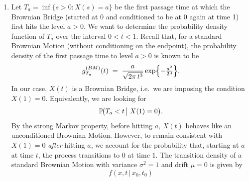 \documentclass[12pt]{article}
\begin{document}
\begin{enumerate}

		Now, think about the fact that $X(t)$ is a Browmian Motion: we know that it has strong Markov property. Therefore we can ``split'' the process in two: instead of considering only one process reaching $x$ at time $t$ and $0$ at time $1$ starting from $y$ at time $\tau$, we consider one process reaching level $x$ at time $t$ starting from $y$ at time $\tau$ and another reaching 0 at time 1 starting from $x$ at time $t$. This makes sense because the probability of going from $(x,t)$ to $(1,0)$ is not dependent on the probability of being in $(y,\tau)$ because of the strong Markov property. Using, as well, independence between increments of Brownian motion, we get
		\begin{equation*}
			\pr(X(t)<x|X(\tau)=y,X(1)=0)=\frac{\pr(X(t)<x|X(\tau)=y)\pr(X(1)=0|X(t)=x)}{\pr(X(1)=0|X(\tau)=y)}
		\end{equation*}
		These are all cumulative density functions, but we want to apply this result to the continuous setting we are working in.
		\begin{equation*}
			\ubracketthin{\frac{\partial}{\partial x}\pr(X(t)<x|X(\tau)=y,X(1)=0)}_{\varphi(x,t|y,\tau)}=\frac{f(x,t|y,\tau)f(0,1|x,t)}{f(0,1|y,\tau)}.
		\end{equation*}
		\item
		Let $T_a = \inf\{ s>0 : X(s) = a\}$ be the {first passage time} at which the Brownian Bridge (started at 0 and conditioned to be at 0 again at time 1) first hits the level $a > 0$. We want to determine the probability density function of $T_a$ over the interval $0 < t < 1$.
		Recall that, for a {standard Brownian Motion} (without conditioning on the endpoint), the probability density of the first passage time to level $a>0$ is known to be
		\[
		g_{T_a}^{(BM)}(t)
		\;=\;
		\frac{a}{\sqrt{2\pi\,t^{3}}}
		\exp\Bigl\{-\tfrac{a^{2}}{2\,t}\Bigr\}.
		\]
		In our case, $X(t)$ is a Brownian Bridge, i.e.\ we are imposing the condition $X(1)=0$. Equivalently, we are looking for
		\[
		\mathbb{P}\!\bigl(T_a < t \,\big|\; X(1)=0\bigr).
		\]
		By the strong Markov property, before hitting $a$, $X(t)$ behaves like an unconditioned Brownian Motion. However, to remain consistent with $X(1)=0$ \textit{after} hitting $a$, we account for the probability that, starting at $a$ at time $t$, the process transitions to $0$ at time $1$. 
		The transition density of a standard Brownian Motion with variance $\sigma^2=1$ and drift $\mu=0$ is given by
		\[
		f(x,t \,|\, x_0,t_0)
\]
\end{enumerate}
\end{document}
